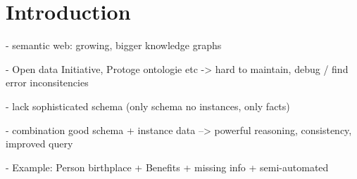 \section{Introduction}

- semantic web: growing, bigger knowledge graphs

- Open data Initiative, Protoge ontologie etc
-> hard to maintain, debug / find error inconsitencies

- lack sophisticated schema (only schema no instances, only facts)

- combination good schema + instance data  --> powerful reasoning, consistency,
improved query

- Example: Person birthplace
  + Benefits
  + missing info
  + semi-automated





